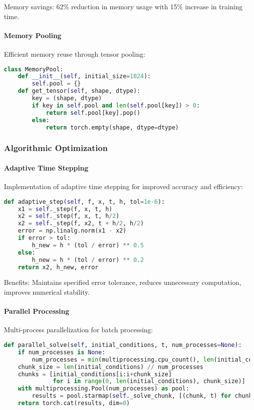 Memory savings: 62\% reduction in memory usage with 15\% increase in training time.

\paragraph{Memory Pooling}
Efficient memory reuse through tensor pooling:

\begin{lstlisting}[language=python, caption=Memory Pooling]
class MemoryPool:
    def __init__(self, initial_size=1024):
        self.pool = {}
    def get_tensor(self, shape, dtype):
        key = (shape, dtype)
        if key in self.pool and len(self.pool[key]) > 0:
            return self.pool[key].pop()
        else:
            return torch.empty(shape, dtype=dtype)
\end{lstlisting}

\subsubsection{Algorithmic Optimization}

\paragraph{Adaptive Time Stepping}
Implementation of adaptive time stepping for improved accuracy and efficiency:

\begin{lstlisting}[language=python, caption=Adaptive Time Stepping]
def adaptive_step(self, f, x, t, h, tol=1e-6):
    x1 = self._step(f, x, t, h)
    x2 = self._step(f, x, t, h/2)
    x2 = self._step(f, x2, t + h/2, h/2)
    error = np.linalg.norm(x1 - x2)
    if error > tol:
        h_new = h * (tol / error) ** 0.5
    else:
        h_new = h * (tol / error) ** 0.2
    return x2, h_new, error
\end{lstlisting}

Benefits: Maintains specified error tolerance, reduces unnecessary computation, improves numerical stability.

\paragraph{Parallel Processing}
Multi-process parallelization for batch processing:

\begin{lstlisting}[language=python, caption=Parallel Processing]
def parallel_solve(self, initial_conditions, t, num_processes=None):
    if num_processes is None:
        num_processes = min(multiprocessing.cpu_count(), len(initial_conditions))
    chunk_size = len(initial_conditions) // num_processes
    chunks = [initial_conditions[i:i+chunk_size] 
              for i in range(0, len(initial_conditions), chunk_size)]
    with multiprocessing.Pool(num_processes) as pool:
        results = pool.starmap(self._solve_chunk, [(chunk, t) for chunk in chunks])
    return torch.cat(results, dim=0)
\end{lstlisting}

